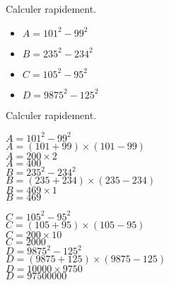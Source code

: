 \begin{exercice*}
    Calculer rapidement.
    \begin{multicols}{2}
        \begin{itemize}
            \item[] $A=101^2-99^2$
            \item[] $B=235^2-234^2$
            \item[] $C=105^2-95^2$
            \item[] $D=\num{9875}^2-125^2$
        \end{itemize}
    \end{multicols}
\end{exercice*}
\begin{corrige}
    Calculer rapidement.
    
        \begin{itemize}
            \def\item{}
            \item $A=101^2-99^2$\\
            {\red 
            $A=(101+99)\times (101-99)$\\
            $A=200\times 2$\\
            $A=400$
            }\\

            \smallskip
            \item $B=235^2-234^2$\\
            {\red 
            $B=(235+234)\times (235-234)$\\
            $B=469\times 1$\\
            $B=469$
            }\\

            \smallskip
        \end{itemize}
        \Coupe
        \begin{itemize}
            \def\item{}
            \item $C=105^2-95^2$\\
            {\red 
            $C=(105+95)\times (105-95)$\\
            $C=200\times 10$\\
            $C=\num{2000}$
            }\\

            \smallskip
            \item $D=\num{9875}^2-125^2$\\
            {\red 
            $D=(\num{9875}+125)\times (\num{9875}-125)$\\
            $D=\num{10000}\times \num{9750}$\\
            $D=\num{97 500 000}$
            }\\

            \smallskip
        \end{itemize}
\end{corrige}

